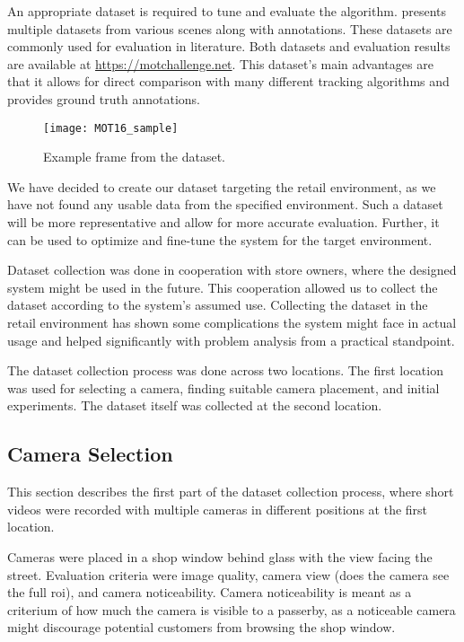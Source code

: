 An appropriate dataset is required to tune and evaluate the algorithm. \cite{MOT16} presents multiple datasets from various scenes along with annotations. These datasets are commonly used for evaluation in literature. Both datasets and evaluation results are available at \url{https://motchallenge.net}. This dataset's main advantages are that it allows for direct comparison with many different tracking algorithms and provides ground truth annotations.

\begin{figure}[ht]
    \centering
    \texttt{[image: MOT16\_sample]}
    \caption{Example frame from the \cite{MOT16} dataset.}
    \label{fig:mot_sample}
\end{figure}

We have decided to create our dataset targeting the retail environment, as we have not found any usable data from the specified environment. Such a dataset will be more representative and allow for more accurate evaluation. Further, it can be used to optimize and fine-tune the system for the target environment. 

Dataset collection was done in cooperation with store owners, where the designed system might be used in the future. This cooperation allowed us to collect the dataset according to the system's assumed use. Collecting the dataset in the retail environment has shown some complications the system might face in actual usage and helped significantly with problem analysis from a practical standpoint.

The dataset collection process was done across two locations. The first location was used for selecting a camera, finding suitable camera placement, and initial experiments. The dataset itself was collected at the second location.

\subsection{Camera Selection}

This section describes the first part of the dataset collection process, where short videos were recorded with multiple cameras in different positions at the first location.

Cameras were placed in a shop window behind glass with the view facing the street. Evaluation criteria were image quality, camera view (does the camera see the full \gls{roi}), and camera noticeability. Camera noticeability is meant as a criterium of how much the camera is visible to a passerby, as a noticeable camera might discourage potential customers from browsing the shop window.

